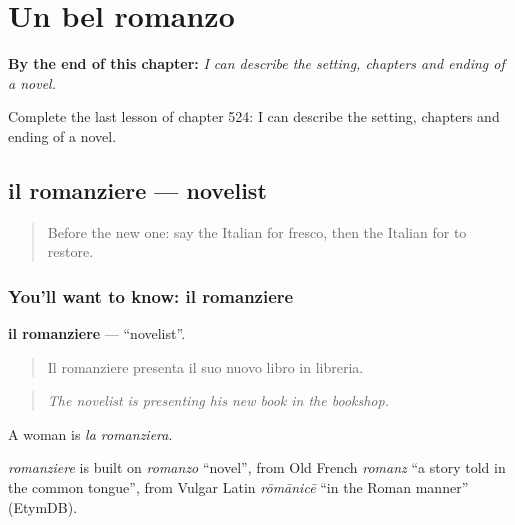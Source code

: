 
\chapter{Un bel romanzo}
\label{ch:it-un-bel-romanzo}

\begin{chapteropening}
\textbf{By the end of this chapter:} \emph{I can describe the setting, chapters and ending of a novel.}

Complete the last lesson of chapter 524: I can describe the setting, chapters and ending of a novel.
\end{chapteropening}

\section[il romanziere]{il romanziere — novelist}

\label{lesson:IT-C524-romanziere}



\begin{quote}
Before the new one: say the Italian for fresco, then the Italian for to restore.
\end{quote}

\subsection*{You'll want to know: il romanziere}
\textbf{il romanziere} — \textquotedblleft{}novelist\textquotedblright{}.

\begin{quote}
Il romanziere presenta il suo nuovo libro in libreria.
\end{quote}

\begin{quote}
\emph{The novelist is presenting his new book in the bookshop.}
\end{quote}

A woman is \emph{la romanziera}.

\begin{cousinweb}
\emph{romanziere} is built on \emph{romanzo} \textquotedblleft{}novel\textquotedblright{}, from Old French \emph{romanz} \textquotedblleft{}a story told in the common tongue\textquotedblright{}, from Vulgar Latin \emph{rōmānicē} \textquotedblleft{}in the Roman manner\textquotedblright{} (EtymDB).
\end{cousinweb}

